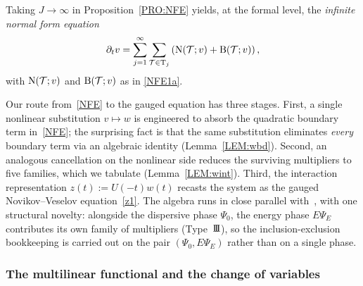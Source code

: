

Taking $J\to\infty$ in Proposition~\ref{PRO:NFE} yields, at the formal level, the \emph{infinite normal form equation}
\begin{align}
\label{NFE}
\partial_t v= \sum_{j=1}^{\infty} \sum_{\mathcal{T}\in \mathrm{T}_j} \left(\mathrm{N}(\mathcal{T};v) + \mathrm{B}(\mathcal{T};v) \right),
\end{align}
with $\mathrm{N}(\mathcal{T};v)$ and $\mathrm{B}(\mathcal{T};v)$ as in \eqref{NFE1a}.

Our route from~\eqref{NFE} to the gauged equation has three stages. First, a single nonlinear substitution $v\mapsto w$ is engineered to absorb the quadratic boundary term in~\eqref{NFE}; the surprising fact is that the same substitution eliminates \emph{every} boundary term via an algebraic identity (Lemma~\ref{LEM:wbd}). Second, an analogous cancellation on the nonlinear side reduces the surviving multipliers to five families, which we tabulate (Lemma~\ref{LEM:wint}). Third, the interaction representation $z(t):=U(-t)w(t)$ recasts the system as the gauged Novikov--Veselov equation~\eqref{z1}. The algebra runs in close parallel with~\cite{chcora}, with one structural novelty: alongside the dispersive phase $\Psi_0$, the energy phase $E\Psi_E$ contributes its own family of multipliers (Type~$\III$), so the inclusion-exclusion bookkeeping is carried out on the pair $(\Psi_0,E\Psi_E)$ rather than on a single phase.

\subsubsection*{The multilinear functional and the change of variables}

